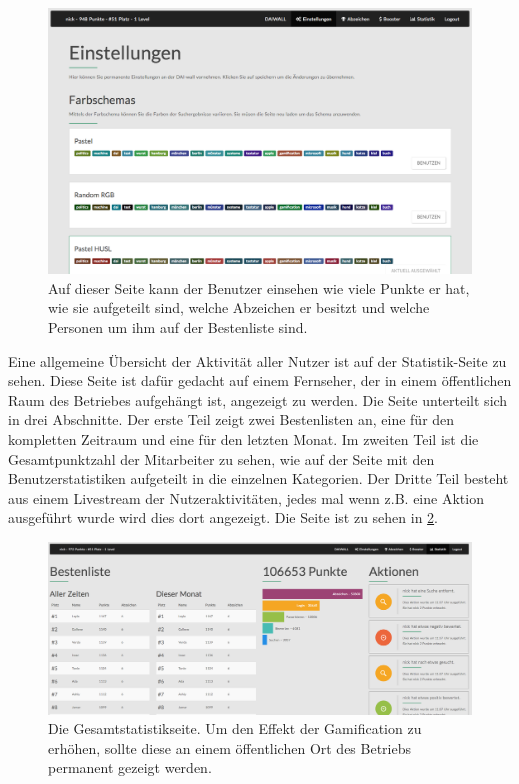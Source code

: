 \documentclass[12pt,twoside]{book}
\begin{document}
\begin{figure}[htbp]
    \centering
    \includegraphics[width=1.0\textwidth]{images/infoboard_settings.png}
    \caption{Auf dieser Seite kann der Benutzer einsehen wie viele Punkte er hat, wie sie aufgeteilt sind, welche Abzeichen er besitzt und welche Personen um ihm auf der Bestenliste sind.}
    \label{fig:settings}
\end{figure}

Eine allgemeine Übersicht der Aktivität aller Nutzer ist auf der Statistik-Seite zu sehen. Diese Seite ist dafür gedacht auf einem Fernseher, der in einem öffentlichen Raum des Betriebes aufgehängt ist, angezeigt zu werden. Die Seite unterteilt sich in drei Abschnitte. Der erste Teil zeigt zwei Bestenlisten an, eine für den kompletten Zeitraum und eine für den letzten Monat. Im zweiten Teil ist die Gesamtpunktzahl der Mitarbeiter zu sehen, wie auf der Seite mit den Benutzerstatistiken aufgeteilt in die einzelnen Kategorien. Der Dritte Teil besteht aus einem Livestream der Nutzeraktivitäten, jedes mal wenn z.B. eine Aktion ausgeführt wurde wird dies dort angezeigt. Die Seite ist zu sehen in \ref{fig:stats}.


\begin{figure}[htbp]
    \centering
    \includegraphics[width=1.0\textwidth]{images/infoboard_stats.png}
    \caption{Die Gesamtstatistikseite. Um den Effekt der Gamification zu erhöhen, sollte diese an einem öffentlichen Ort des Betriebs permanent gezeigt werden.}
    \label{fig:stats}
\end{figure}
\end{document}
